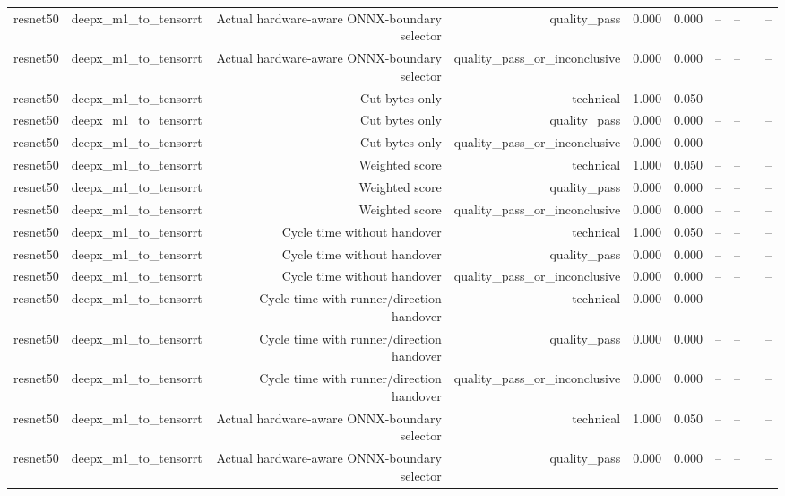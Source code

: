 \begin{table}[t]
\begin{tabular}{lrrrrrrrrr}
resnet50 & deepx\_m1\_to\_tensorrt & Actual hardware-aware ONNX-boundary selector & quality\_pass & 0.000 & 0.000 & -- & -- &  & -- \\
resnet50 & deepx\_m1\_to\_tensorrt & Actual hardware-aware ONNX-boundary selector & quality\_pass\_or\_inconclusive & 0.000 & 0.000 & -- & -- &  & -- \\
resnet50 & deepx\_m1\_to\_tensorrt & Cut bytes only & technical & 1.000 & 0.050 & -- & -- &  & -- \\
resnet50 & deepx\_m1\_to\_tensorrt & Cut bytes only & quality\_pass & 0.000 & 0.000 & -- & -- &  & -- \\
resnet50 & deepx\_m1\_to\_tensorrt & Cut bytes only & quality\_pass\_or\_inconclusive & 0.000 & 0.000 & -- & -- &  & -- \\
resnet50 & deepx\_m1\_to\_tensorrt & Weighted score & technical & 1.000 & 0.050 & -- & -- &  & -- \\
resnet50 & deepx\_m1\_to\_tensorrt & Weighted score & quality\_pass & 0.000 & 0.000 & -- & -- &  & -- \\
resnet50 & deepx\_m1\_to\_tensorrt & Weighted score & quality\_pass\_or\_inconclusive & 0.000 & 0.000 & -- & -- &  & -- \\
resnet50 & deepx\_m1\_to\_tensorrt & Cycle time without handover & technical & 1.000 & 0.050 & -- & -- &  & -- \\
resnet50 & deepx\_m1\_to\_tensorrt & Cycle time without handover & quality\_pass & 0.000 & 0.000 & -- & -- &  & -- \\
resnet50 & deepx\_m1\_to\_tensorrt & Cycle time without handover & quality\_pass\_or\_inconclusive & 0.000 & 0.000 & -- & -- &  & -- \\
resnet50 & deepx\_m1\_to\_tensorrt & Cycle time with runner/direction handover & technical & 0.000 & 0.000 & -- & -- &  & -- \\
resnet50 & deepx\_m1\_to\_tensorrt & Cycle time with runner/direction handover & quality\_pass & 0.000 & 0.000 & -- & -- &  & -- \\
resnet50 & deepx\_m1\_to\_tensorrt & Cycle time with runner/direction handover & quality\_pass\_or\_inconclusive & 0.000 & 0.000 & -- & -- &  & -- \\
resnet50 & deepx\_m1\_to\_tensorrt & Actual hardware-aware ONNX-boundary selector & technical & 1.000 & 0.050 & -- & -- &  & -- \\
resnet50 & deepx\_m1\_to\_tensorrt & Actual hardware-aware ONNX-boundary selector & quality\_pass & 0.000 & 0.000 & -- & -- &  & -- \\

\end{tabular}
\end{table}
